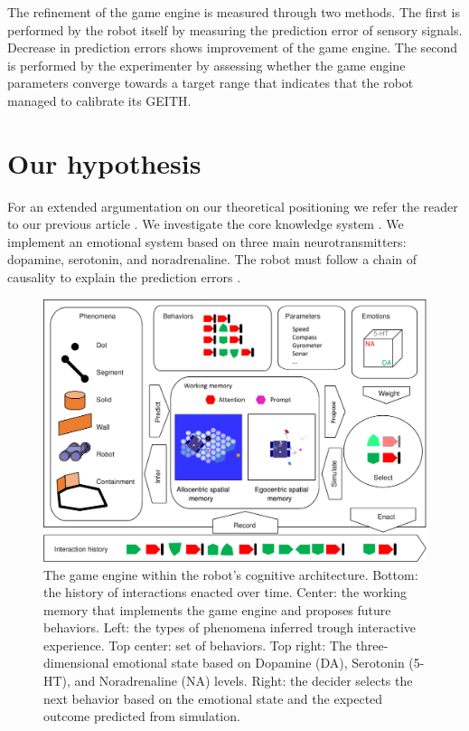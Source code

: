 \documentclass[runningheads]{llncs}
\begin{document}
The refinement of the game engine is measured through two methods. 
The first is performed by the robot itself by measuring the prediction error of sensory signals. 
Decrease in prediction errors shows improvement of the game engine. 
The second is performed by the experimenter by assessing whether the game engine parameters converge towards a target range that indicates that the robot managed to calibrate its GEITH. 




\section{Our hypothesis}

For an extended argumentation on our theoretical positioning we refer the reader to our previous article \cite{georgeon_artificial_2024}.
We investigate the core knowledge system \cite{spelke_core_2012}.
We implement an emotional system \cite{chebotareva_emotional_2019} based on three main neurotransmitters: dopamine, serotonin, and noradrenaline.
The robot must follow a chain of causality to explain the prediction errors \cite{thorisson_explanation_2021}.

\begin{figure}
	\includegraphics[width=\textwidth]{Figure_geith.pdf}
	\caption{The game engine within the robot's cognitive architecture.
	Bottom: the history of interactions enacted over time.
	Center: the working memory that implements the game engine and proposes future behaviors.
	Left: the types of phenomena inferred trough interactive experience.
	Top center: set of behaviors.
	Top right: The three-dimensional emotional state based on Dopamine (DA), Serotonin (5-HT), and Noradrenaline (NA) levels.
	Right: the decider selects the next behavior based on the emotional state and the expected outcome predicted from simulation.} \label{fig:geith}
\end{figure}
\end{document}
